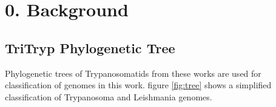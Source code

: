 \documentclass[table,
12pt, %
a4paper, %
oneside, %
headinclude,footinclude, %
BCOR5mm, %
]{scrartcl}
\title{\normalfont\spacedallcaps{}} %
\begin{document}

\renewcommand{\sectionmark}[1]{\markright{\spacedlowsmallcaps{#1}}} %
\lehead{\mbox{\llap{\small\thepage\kern1em\color{halfgray} \vline}\color{halfgray}\hspace{0.5em}\rightmark\hfil}} %

\pagestyle{scrheadings} %



\setcounter{tocdepth}{3} %





\newpage

\section{0. Background}

\subsection{TriTryp Phylogenetic Tree}
Phylogenetic trees of Trypanosomatids from these works \cite{Souza:2018dg,Hughes:2003,Pothirat:2014,Kelly:2017} are used for classification of genomes in this work. figure \ref{fig:tree} shows a simplified classification of Trypanosoma and Leishmania genomes.
\end{document}
